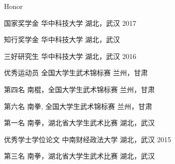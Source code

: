\begin{xframe}{Honor}
    \begin{cvhonors}

        \cvhonor
        {国家奖学金} %
        {华中科技大学} %
        {湖北，武汉} %
        {2017} %

        \cvhonor
        {知行奖学金} %
        {华中科技大学} %
        {湖北，武汉} %
        {} %


        \cvhonor
        {三好研究生} %
        {华中科技大学} %
        {湖北，武汉} %
        {2016} %




        \cvhonor
        {优秀运动员} %
        {全国大学生武术锦标赛} %
        {兰州，甘肃} %
        { } %


        \cvhonor
        {第四名} %
        {南棍，全国大学生武术锦标赛} %
        {兰州，甘肃} %
        { } %


        \cvhonor
        {第六名} %
        {南拳, 全国大学生武术锦标赛} %
        {兰州，甘肃} %
        { } %


        \cvhonor
        {第一名} %
        {南拳，湖北省大学生武术比赛} %
        {湖北，武汉} %
        { } %


        \cvhonor
        {优秀学士学位论文} %
        {中南财经政法大学} %
        {湖北，武汉} %
        {2015} %



        \cvhonor
        {第三名} %
        {南拳，湖北省大学生武术比赛} %
        {湖北，武汉} %
        { } %
    \end{cvhonors}
\end{xframe}

